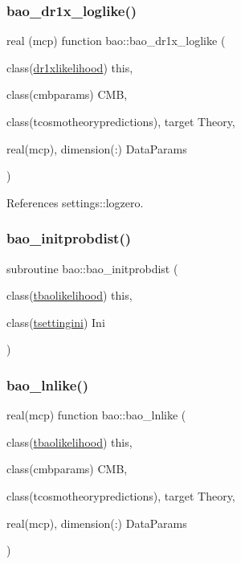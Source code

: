\subsubsection{\texorpdfstring{bao\+\_\+dr1x\+\_\+loglike()}{bao\_dr1x\_loglike()}}
{\footnotesize\ttfamily real (mcp) function bao\+::bao\+\_\+dr1x\+\_\+loglike (\begin{DoxyParamCaption}\item[{class(\mbox{\hyperlink{structbao_1_1dr1xlikelihood}{dr1xlikelihood}})}]{this,  }\item[{class(cmbparams)}]{C\+MB,  }\item[{class(tcosmotheorypredictions), target}]{Theory,  }\item[{real(mcp), dimension(\+:)}]{Data\+Params }\end{DoxyParamCaption})\hspace{0.3cm}{\ttfamily [private]}}



References settings\+::logzero.

\mbox{\label{namespacebao_a42ad1b0022e37bb1e4457c7a4e329b12}} 
\subsubsection{\texorpdfstring{bao\+\_\+initprobdist()}{bao\_initprobdist()}}
{\footnotesize\ttfamily subroutine bao\+::bao\+\_\+initprobdist (\begin{DoxyParamCaption}\item[{class(\mbox{\hyperlink{structbao_1_1tbaolikelihood}{tbaolikelihood}})}]{this,  }\item[{class(\mbox{\hyperlink{structsettings_1_1tsettingini}{tsettingini}})}]{Ini }\end{DoxyParamCaption})\hspace{0.3cm}{\ttfamily [private]}}

\mbox{\label{namespacebao_a9a4c24c4606056286bb571c62350ccb3}} 
\subsubsection{\texorpdfstring{bao\+\_\+lnlike()}{bao\_lnlike()}}
{\footnotesize\ttfamily real(mcp) function bao\+::bao\+\_\+lnlike (\begin{DoxyParamCaption}\item[{class(\mbox{\hyperlink{structbao_1_1tbaolikelihood}{tbaolikelihood}})}]{this,  }\item[{class(cmbparams)}]{C\+MB,  }\item[{class(tcosmotheorypredictions), target}]{Theory,  }\item[{real(mcp), dimension(\+:)}]{Data\+Params }\end{DoxyParamCaption})\hspace{0.3cm}{\ttfamily [private]}}



